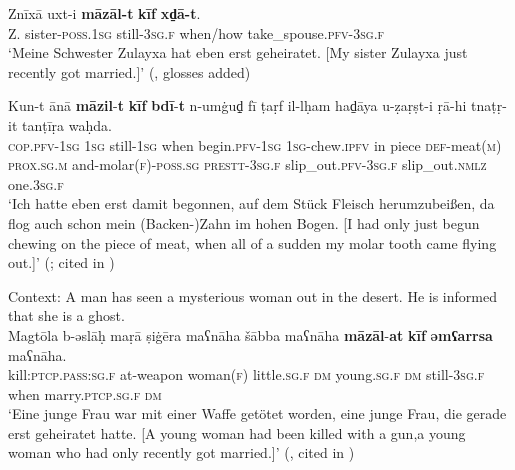 \begin{exe}
	\ex\label{exAppendixTunisianImmediatePast1}
	\gll Znīxā uxt-i \textbf{māzāl-t} \textbf{kīf} \textbf{xd̠ā-t}.\\
	Z. sister-\textsc{poss}.1\textsc{sg} still-3\textsc{sg}.\textsc{f} when/how take\_spouse.\textsc{pfv}-3\textsc{sg}.\textsc{f}\\
	\glt \lq Meine Schwester Zulayxa hat eben erst geheiratet. [My sister Zulayxa just recently got married.]' (\cite[651]{Singer1984}, glosses added)
	
	\ex \label{exAppendixTunisianImmediatePast2}
	\gll Kun-t ānā \textbf{māzil}-\textbf{t} \textbf{kīf} \textbf{bdī}-\textbf{t} n-umġud̠̣ fī ṭaṛf il-lḥam had̠āya u-ẓaṛṣt-i ṛā-hi tnaṭṛ-it tanṭīṛa waḥda.\\
	\textsc{cop}.\textsc{pfv}-1\textsc{sg} 1\textsc{sg} still-1\textsc{sg} when begin.\textsc{pfv}-1\textsc{sg} 1\textsc{sg}-chew.\textsc{ipfv} in piece \textsc{def}-meat(\textsc{m}) \textsc{prox}.\textsc{sg}.\textsc{m} and-molar(\textsc{f})-\textsc{poss}.\textsc{sg} \textsc{prestt}-3\textsc{sg}.\textsc{f} slip\_out.\textsc{pfv}-3\textsc{sg}.\textsc{f} slip\_out.\textsc{nmlz} one.3\textsc{sg}.\textsc{f}\\
	\glt \lq Ich hatte eben erst damit begonnen, auf dem Stück Fleisch herumzubeißen, da flog auch schon mein (Backen-)Zahn im hohen Bogen. [I had only just begun chewing on the piece of meat, when all of a sudden my molar tooth came flying out.]\rq{ }(\cite[651]{Singer1984}; cited in \cite{FischerEtAlTunisian})	
	
	\ex \label{exAppendixTunisianImmediatePast3}
Context: A man has seen a mysterious woman out in the desert. He is informed that she is a ghost.\\
	\gll Magtōla b-ǝslāḥ maṛā ṣiġēra maʕnāha šābba maʕnāha \textbf{māzāl}-\textbf{at} \textbf{kīf} \textbf{ǝmʕarrsa} maʕnāha.\\
	kill:\textsc{ptcp}.\textsc{pass}:\textsc{sg}.\textsc{f} at-weapon woman(\textsc{f}) little.\textsc{sg}.\textsc{f} \textsc{dm} young.\textsc{sg}.\textsc{f}  \textsc{dm} still-3\textsc{sg}.\textsc{f} when marry.\textsc{ptcp}.\textsc{sg}.\textsc{f} \textsc{dm}\\
	\glt \lq Eine junge Frau war mit einer Waffe getötet worden, eine junge Frau, die gerade erst geheiratet hatte. [A young woman had been killed with a gun,a young woman  who had only recently got married.]\rq{ }(\cite[408–409]{RittBenmimoun2011}, cited in \cite{FischerEtAlTunisian})	
\end{exe}

